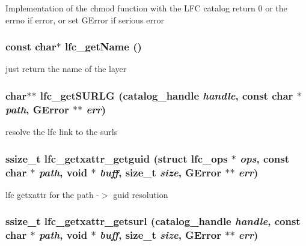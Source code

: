 Implementation of the chmod function with the LFC catalog return 0 or the errno if error, or set GError if serious error 
\subsubsection{\setlength{\rightskip}{0pt plus 5cm}const char$\ast$ lfc\_\-get\-Name ()}\label{gfal__common__lfc_8c_67715cf749ea720de31abbc67f9f414e}


just return the name of the layer 
\subsubsection{\setlength{\rightskip}{0pt plus 5cm}char$\ast$$\ast$ lfc\_\-get\-SURLG (catalog\_\-handle {\em handle}, const char $\ast$ {\em path}, GError $\ast$$\ast$ {\em err})}\label{gfal__common__lfc_8c_7c1d8699d8ad924234db163860dadf40}


resolve the lfc link to the surls 
\subsubsection{\setlength{\rightskip}{0pt plus 5cm}ssize\_\-t lfc\_\-getxattr\_\-getguid (struct lfc\_\-ops $\ast$ {\em ops}, const char $\ast$ {\em path}, void $\ast$ {\em buff}, size\_\-t {\em size}, GError $\ast$$\ast$ {\em err})}\label{gfal__common__lfc_8c_7190518fdee00f531882d241dc5b5ee2}


lfc getxattr for the path -$>$ guid resolution 
\subsubsection{\setlength{\rightskip}{0pt plus 5cm}ssize\_\-t lfc\_\-getxattr\_\-getsurl (catalog\_\-handle {\em handle}, const char $\ast$ {\em path}, void $\ast$ {\em buff}, size\_\-t {\em size}, GError $\ast$$\ast$ {\em err})}\label{gfal__common__lfc_8c_3b14a6913fa0483a07076140d46bbf99}


